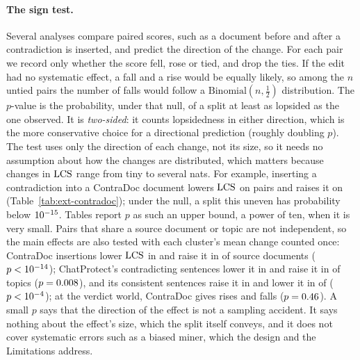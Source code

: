 \paragraph{The sign test.} Several analyses compare paired scores, such as a document before
and after a contradiction is inserted, and predict the direction of the change. For each pair we
record only whether the score fell, rose or tied, and drop the ties. If the edit had no systematic
effect, a fall and a rise would be equally likely, so among the $n$ untied pairs the number of falls
would follow a $\mathrm{Binomial}(n,\frac12)$ distribution. The $p$-value is the probability, under
that null, of a split at least as lopsided as the one observed. It is \emph{two-sided}: it counts
lopsidedness in either direction, which is the more conservative choice for a directional
prediction (roughly doubling $p$). The test uses only the
direction of each change, not its size, so it needs no assumption about how the changes are
distributed, which matters because changes in $\mathrm{LCS}$ range from tiny to several nats. For example,
inserting a contradiction into a ContraDoc document lowers $\mathrm{LCS}$ on \extCdAssertDecGpt{} pairs and
raises it on \extCdAssertIncGpt{} (Table~\ref{tab:ext-contradoc}); under the null, a split this
uneven has probability below $10^{-15}$. Tables report $p$ as such an upper bound, a power
of ten, when it is very small. Pairs that share a source document or topic are not independent, so the
main effects are also tested with each cluster's mean change counted once: ContraDoc insertions
lower $\mathrm{LCS}$ in \extCdClAssertDecGpt{} and raise it in \extCdClAssertIncGpt{} of \extCdClAssertNGpt{}
source documents ($p<10^{-14}$); ChatProtect's contradicting sentences lower it in
\extCpClAssertDecGpt{} and raise it in \extCpClAssertIncGpt{} of \extCpClAssertNGpt{} topics
($p=0.008$), and its consistent sentences raise it in \extCpClCtlIncGpt{} and lower it in
\extCpClCtlDecGpt{} of \extCpClCtlNGpt{} ($p<10^{-4}$); at the verdict world, ContraDoc gives
\extCdClVerdEdgeIncGpt{} rises and \extCdClVerdEdgeDecGpt{} falls ($p=0.46$). A small $p$ says that the direction of the effect is not a sampling
accident. It says nothing about the effect's size, which the split itself conveys, and it does not
cover systematic errors such as a biased miner, which the design and the Limitations address.

